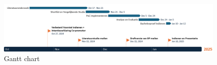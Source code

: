 \begin{figure}[h]
  \centering
  \includegraphics[width=1.0\textwidth]{GanttChart.png}
  \caption{Gantt chart}
  \label{fig:gantt-chart}
\end{figure}

